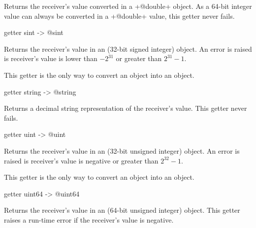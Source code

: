 Returns the receiver's value converted in a \ggs+@double+ object. As a 64-bit integer value can always be converted in a \ggs+@double+ value, this getter never fails.





\begin{galgas}
getter sint -> @sint
\end{galgas}

Returns the receiver's value in an  (32-bit signed integer) object. An error is raised is receiver's value is lower than $-2^{31}$ or greater than $2^{31}-1$.

This getter is the only way to convert an  object into an  object.






\begin{galgas}
getter string -> @string
\end{galgas}

Returns a decimal string representation of the receiver's value. This getter never fails.









\begin{galgas}
getter uint -> @uint
\end{galgas}

Returns the receiver's value in an  (32-bit unsigned integer) object. An error is raised is receiver's value is negative or greater than $2^{32}-1$.

This getter is the only way to convert an  object into an  object.






\begin{galgas}
getter uint64 -> @uint64
\end{galgas}

Returns the receiver's value in an  (64-bit unsigned integer) object. This getter raises a run-time error if the receiver's value is negative.

